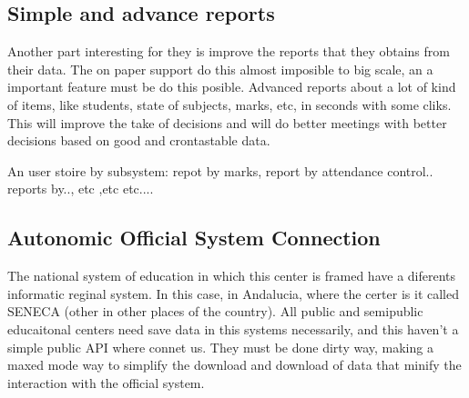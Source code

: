 \bigskip
\subsection{Simple and advance reports}
\bigskip

Another part interesting for they is improve the reports that they obtains from their data. The on paper support do this almost imposible to big scale, an a important feature must be do this posible. Advanced reports about a lot of kind of items, like students, state of subjects, marks, etc, in seconds with some cliks.
This will improve the take of decisions and will do better meetings with better decisions based on good and crontastable data.


An user stoire by subsystem: repot by marks, report by attendance control..
reports by.., etc ,etc etc....


\noindent{}



\bigskip
\subsection{Autonomic Official System Connection}
\bigskip

The national system of education in which this center is framed have a diferents informatic reginal system. In this case, in Andalucia, where the certer is it called SENECA (other in other places of the country). All public and semipublic educaitonal centers need save data in this systems necessarily, and this haven't a simple public API where connet us. They must be done dirty way, making a maxed mode way to simplify the download and download of data that minify the interaction with the official system.

